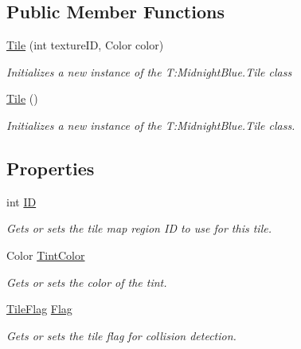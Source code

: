 \subsection*{Public Member Functions}
\begin{DoxyCompactItemize}
\item 
\hyperlink{class_m_b2_d_1_1_tile_ab9e2260dc2c752c36a248660d99b0e34}{Tile} (int texture\+ID, Color color)
\begin{DoxyCompactList}\small\item\em Initializes a new instance of the T\+:\+Midnight\+Blue.\+Tile class \end{DoxyCompactList}\item 
\hyperlink{class_m_b2_d_1_1_tile_a9bd9f08b191b87916f209ac7b9ce989c}{Tile} ()
\begin{DoxyCompactList}\small\item\em Initializes a new instance of the T\+:\+Midnight\+Blue.\+Tile class. \end{DoxyCompactList}\end{DoxyCompactItemize}
\subsection*{Properties}
\begin{DoxyCompactItemize}
\item 
int \hyperlink{class_m_b2_d_1_1_tile_a4b10263cc9eeca4a37043c6d99d81ace}{ID}
\begin{DoxyCompactList}\small\item\em Gets or sets the tile map region ID to use for this tile. \end{DoxyCompactList}\item 
Color \hyperlink{class_m_b2_d_1_1_tile_aec3aa2408ecc89cc40095f22b907eaa5}{Tint\+Color}
\begin{DoxyCompactList}\small\item\em Gets or sets the color of the tint. \end{DoxyCompactList}\item 
\hyperlink{namespace_m_b2_d_a3ff821c2c17b424864d890d0b26536ea}{Tile\+Flag} \hyperlink{class_m_b2_d_1_1_tile_a46c14f1195c382dc033a26fa7ad407eb}{Flag}
\begin{DoxyCompactList}\small\item\em Gets or sets the tile flag for collision detection. \end{DoxyCompactList}\end{DoxyCompactItemize}


